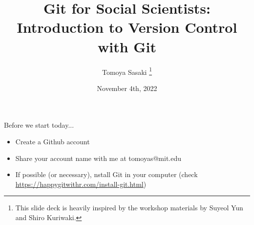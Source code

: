 \documentclass[handout,pdftex,10pt,aspectratio=169]{beamer}
\title[Git workshop]{Git for Social Scientists: Introduction to Version Control with Git}
\author[Tomoya]{Tomoya Sasaki%
\thanks{This slide deck is heavily inspired by the workshop materials by Suyeol Yun and Shiro Kuriwaki.}}
\institute[MIT]{Massachusetts Institute of Technology}
\date[Fall 2022]{November 4th, 2022}
\begin{document}
\begin{frame}{Before we start today...}
  \begin{itemize}
    \item Create a Github account
    \item Share your account name with me at tomoyas@mit.edu
    \item If possible (or necessary), nstall Git in your computer (check \url{https://happygitwithr.com/install-git.html})
  \end{itemize}
\end{frame}

\begin{frame}
  \titlepage
  \end{frame}
  
\end{document}
